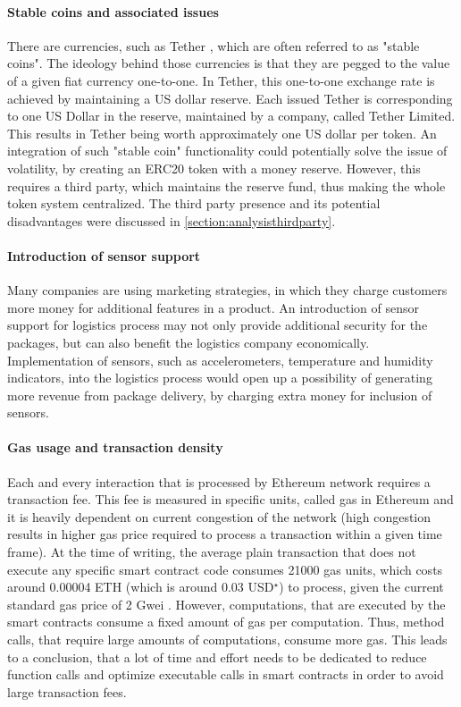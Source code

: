 \paragraph{Stable coins and associated issues}
There are currencies, such as Tether \citep{tether}, which are often referred to as "stable coins". The ideology behind those currencies is that they are pegged to the value of a given fiat currency one-to-one. In Tether, this one-to-one exchange rate is achieved by maintaining a US dollar reserve. Each issued Tether is corresponding to one US Dollar in the reserve, maintained by a company, called Tether Limited. This results in Tether being worth approximately one US dollar per token. An integration of such "stable coin" functionality could potentially solve the issue of volatility, by creating an ERC20 token with a money reserve. However, this requires a third party, which maintains the reserve fund, thus making the whole token system centralized. The third party presence and its potential disadvantages were discussed in \ref{section:analysisthirdparty}.

\paragraph{Introduction of sensor support}
Many companies are using marketing strategies, in which they charge customers more money for additional features in a product. An introduction of sensor support for logistics process may not only provide additional security for the packages, but can also benefit the logistics company economically. Implementation of sensors, such as accelerometers, temperature and humidity indicators, into the logistics process would open up a possibility of generating more revenue from package delivery, by charging extra money for inclusion of sensors.

\paragraph{Gas usage and transaction density}
Each and every interaction that is processed by Ethereum network requires a transaction fee. This fee is measured in specific units, called gas in Ethereum and it is heavily dependent on current congestion of the network (high congestion results in higher gas price required to process a transaction within a given time frame). At the time of writing, the average plain transaction that does not execute any specific smart contract code consumes 21000 gas units, which costs around 0.00004 ETH (which is around 0.03 USD$^\star$) to process, given the current standard gas price of 2 Gwei \citep{ethgasstation}. However, computations, that are executed by the smart contracts consume a fixed amount of gas per computation. Thus, method calls, that require large amounts of computations, consume more gas. This leads to a conclusion, that a lot of time and effort needs to be dedicated to reduce function calls and optimize executable calls in smart contracts in order to avoid large transaction fees.

